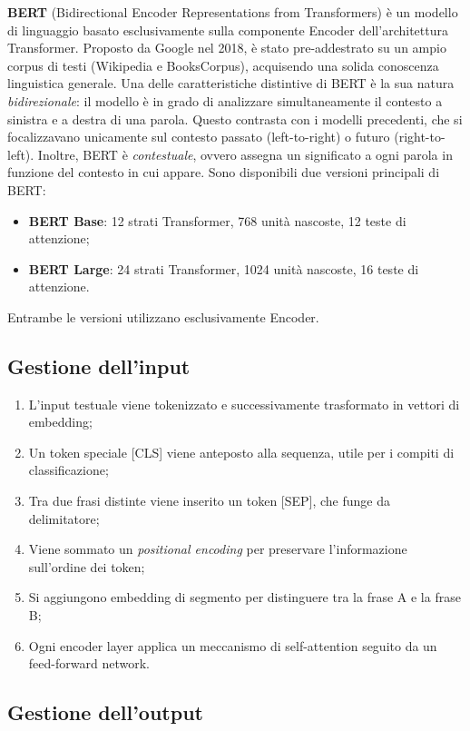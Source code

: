 \textbf{BERT} (Bidirectional Encoder Representations from Transformers) è un modello di linguaggio basato esclusivamente sulla componente Encoder dell'architettura Transformer. Proposto da Google nel 2018, è stato pre-addestrato su un ampio corpus di testi (Wikipedia e BooksCorpus), acquisendo una solida conoscenza linguistica generale. Una delle caratteristiche distintive di BERT è la sua natura \textit{bidirezionale}: il modello è in grado di analizzare simultaneamente il contesto a sinistra e a destra di una parola. Questo contrasta con i modelli precedenti, che si focalizzavano unicamente sul contesto passato (left-to-right) o futuro (right-to-left). Inoltre, BERT è \textit{contestuale}, ovvero assegna un significato a ogni parola in funzione del contesto in cui appare. Sono disponibili due versioni principali di BERT:
\begin{itemize}
    \item \textbf{BERT Base}: 12 strati Transformer, 768 unità nascoste, 12 teste di attenzione;
    \item \textbf{BERT Large}: 24 strati Transformer, 1024 unità nascoste, 16 teste di attenzione.
\end{itemize}
Entrambe le versioni utilizzano esclusivamente Encoder.

\subsection{Gestione dell'input}

\begin{enumerate}
    \item L'input testuale viene tokenizzato e successivamente trasformato in vettori di embedding;
    \item Un token speciale [CLS] viene anteposto alla sequenza, utile per i compiti di classificazione;
    \item Tra due frasi distinte viene inserito un token [SEP], che funge da delimitatore;
    \item Viene sommato un \textit{positional encoding} per preservare l'informazione sull'ordine dei token;
    \item Si aggiungono embedding di segmento per distinguere tra la frase A e la frase B;
    \item Ogni encoder layer applica un meccanismo di self-attention seguito da un feed-forward network.
\end{enumerate}

\subsection{Gestione dell'output}

